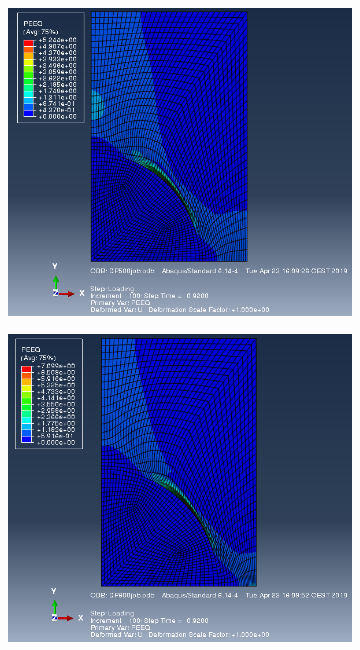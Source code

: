 \documentclass{article}
\begin{document}
\begin{figure}[h!]
     \centering
     \begin{subfigure}[b]{0.45\textwidth}
         \centering
         \includegraphics[width=\textwidth]{PlastStrain500.png}
         \caption{}
         \label{fig:PlastStrain500}
     \end{subfigure}
     \begin{subfigure}[b]{0.45\textwidth}
         \centering
         \includegraphics[width=\textwidth]{PlastStrain600.png}

\end{subfigure}
\end{figure}
\end{document}
